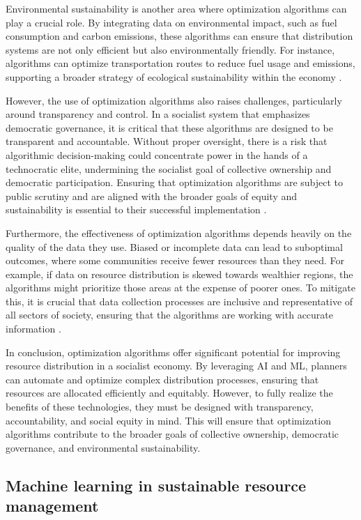 \begin{refsection}
Environmental sustainability is another area where optimization algorithms can play a crucial role. By integrating data on environmental impact, such as fuel consumption and carbon emissions, these algorithms can ensure that distribution systems are not only efficient but also environmentally friendly. For instance, algorithms can optimize transportation routes to reduce fuel usage and emissions, supporting a broader strategy of ecological sustainability within the economy \cite[pp.~78-82]{mazzucato2023}.

However, the use of optimization algorithms also raises challenges, particularly around transparency and control. In a socialist system that emphasizes democratic governance, it is critical that these algorithms are designed to be transparent and accountable. Without proper oversight, there is a risk that algorithmic decision-making could concentrate power in the hands of a technocratic elite, undermining the socialist goal of collective ownership and democratic participation. Ensuring that optimization algorithms are subject to public scrutiny and are aligned with the broader goals of equity and sustainability is essential to their successful implementation \cite[pp.~98-101]{schneider2018}.

Furthermore, the effectiveness of optimization algorithms depends heavily on the quality of the data they use. Biased or incomplete data can lead to suboptimal outcomes, where some communities receive fewer resources than they need. For example, if data on resource distribution is skewed towards wealthier regions, the algorithms might prioritize those areas at the expense of poorer ones. To mitigate this, it is crucial that data collection processes are inclusive and representative of all sectors of society, ensuring that the algorithms are working with accurate information \cite[pp.~89-92]{treccani2021}.

In conclusion, optimization algorithms offer significant potential for improving resource distribution in a socialist economy. By leveraging AI and ML, planners can automate and optimize complex distribution processes, ensuring that resources are allocated efficiently and equitably. However, to fully realize the benefits of these technologies, they must be designed with transparency, accountability, and social equity in mind. This will ensure that optimization algorithms contribute to the broader goals of collective ownership, democratic governance, and environmental sustainability.

\subsection{Machine learning in sustainable resource management}


\end{refsection}
